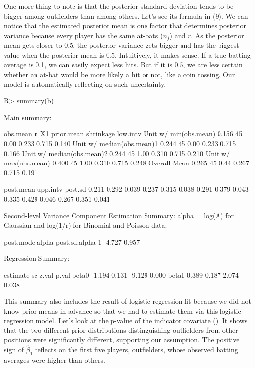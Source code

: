 \documentclass[article]{jss}
\begin{document}
One more thing to note is that the posterior standard deviation tends to be bigger among outfielders than among others. Let's see its formula in (9). We can notice that the estimated posterior mean is one factor that determines posterior variance because every player has the same at-bats ($n_{j}$) and $r$. As the posterior mean gets closer to 0.5, the posterior variance gets bigger and has the biggest value when the posterior mean is 0.5. Intuitively, it makes sense. If a true batting average is 0.1, we can easily expect less hits. But if it is 0.5, we are less certain whether an at-bat would be more likely a hit or not, like a coin tossing. Our model is automatically reflecting on such uncertainty.
\begin{CodeChunk}
\begin{CodeInput}
R> summary(b)
\end{CodeInput}
\begin{CodeOutput}
Main summary:

                          obs.mean  n   X1 prior.mean shrinkage low.intv
Unit w/ min(obs.mean)        0.156 45 0.00      0.233     0.715    0.140
Unit w/ median(obs.mean)1    0.244 45 0.00      0.233     0.715    0.166
Unit w/ median(obs.mean)2    0.244 45 1.00      0.310     0.715    0.210
Unit w/ max(obs.mean)        0.400 45 1.00      0.310     0.715    0.248
Overall Mean                 0.265 45 0.44      0.267     0.715    0.191

                         post.mean upp.intv post.sd
                             0.211    0.292   0.039
                             0.237    0.315   0.038
                             0.291    0.379   0.043
                             0.335    0.429   0.046
                             0.267    0.351   0.041

Second-level Variance Component Estimation Summary:
alpha = log(A) for Gaussian and log(1/r) for Binomial and Poisson data:

  post.mode.alpha post.sd.alpha
1          -4.727         0.957


Regression Summary:

      estimate    se  z.val p.val
beta0   -1.194 0.131 -9.129 0.000
beta1    0.389 0.187  2.074 0.038
\end{CodeOutput}
\end{CodeChunk}

This summary also includes the result of logistic regression fit because we did not know prior means in advance so that we had to estimate them via this logistic regression model. Let's look at the p-value of the indicator covariate (). It shows that the two different prior distributions distinguishing outfielders from other positions were significantly different, supporting our assumption. The positive sign of $\hat{\beta}_{1}$ reflects on the first five players, outfielders, whose observed batting averages were higher than others.
\\
\end{document}

